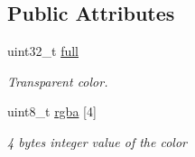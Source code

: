 \subsection*{Public Attributes}
\begin{DoxyCompactItemize}
\item 
\mbox{\label{unionarcade_1_1Color_ad68cc4b72cafa2c89dac97a336d1ca32}} 
uint32\+\_\+t \hyperlink{unionarcade_1_1Color_ad68cc4b72cafa2c89dac97a336d1ca32}{full}
\begin{DoxyCompactList}\small\item\em Transparent color. \end{DoxyCompactList}\item 
\mbox{\label{unionarcade_1_1Color_a805bb231543d607ee00f353506c850be}} 
uint8\+\_\+t \hyperlink{unionarcade_1_1Color_a805bb231543d607ee00f353506c850be}{rgba} \mbox{[}4\mbox{]}
\begin{DoxyCompactList}\small\item\em 4 bytes integer value of the color \end{DoxyCompactList}\end{DoxyCompactItemize}
